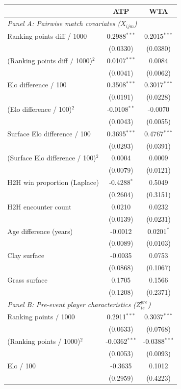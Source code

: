 \begin{tabular}{lcc}
\toprule
 & ATP & WTA \\
\midrule
\multicolumn{3}{l}{\textit{Panel A: Pairwise match covariates ($X_{ijm}$)}} \\
Ranking points diff / 1000 & 0.2988$^{***}$ & 0.2015$^{***}$ \\
 & (0.0330) & (0.0380) \\
(Ranking points diff / 1000)$^2$ & 0.0107$^{***}$ & 0.0084 \\
 & (0.0041) & (0.0062) \\
Elo difference / 100 & 0.3508$^{***}$ & 0.3017$^{***}$ \\
 & (0.0191) & (0.0228) \\
(Elo difference / 100)$^2$ & -0.0108$^{**}$ & -0.0070 \\
 & (0.0043) & (0.0055) \\
Surface Elo difference / 100 & 0.3695$^{***}$ & 0.4767$^{***}$ \\
 & (0.0293) & (0.0391) \\
(Surface Elo difference / 100)$^2$ & 0.0004 & 0.0009 \\
 & (0.0079) & (0.0121) \\
H2H win proportion (Laplace) & -0.4288$^{*}$ & 0.5049 \\
 & (0.2604) & (0.3151) \\
H2H encounter count & 0.0210 & 0.0232 \\
 & (0.0139) & (0.0231) \\
Age difference (years) & -0.0012 & 0.0201$^{*}$ \\
 & (0.0089) & (0.0103) \\
Clay surface & -0.0035 & 0.0753 \\
 & (0.0868) & (0.1067) \\
Grass surface & 0.1705 & 0.1566 \\
 & (0.1208) & (0.2371) \\
\midrule
\multicolumn{3}{l}{\textit{Panel B: Pre-event player characteristics ($Z^{pre}_{ie}$)}} \\
Ranking points / 1000 & 0.2911$^{***}$ & 0.3037$^{***}$ \\
 & (0.0633) & (0.0768) \\
(Ranking points / 1000)$^2$ & -0.0362$^{***}$ & -0.0388$^{***}$ \\
 & (0.0053) & (0.0093) \\
Elo / 100 & -0.3635 & 0.1012 \\
 & (0.2959) & (0.4223) \\

\end{tabular}
